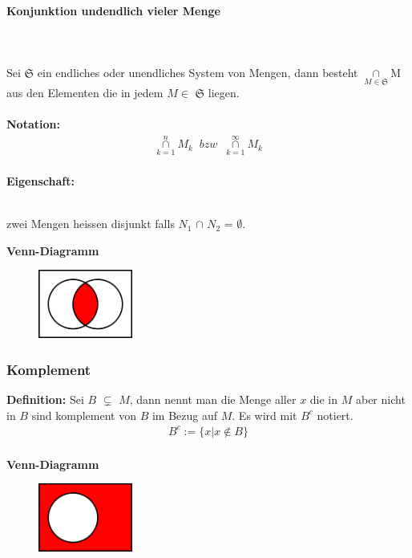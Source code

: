 \documentclass[../AbiMappe_Mathe.tex]{subfiles}
\begin{document}
\paragraph{Konjunktion undendlich vieler Menge}
		\hspace{0 cm} \\ \noindent \\
		Sei $\mathfrak{S}$ ein endliches oder unendliches System von Mengen, dann besteht $\underset{M \in \mathfrak{S}}{\cap}$M aus den Elementen die in jedem $M \in  $ $\mathfrak{S}$ liegen.\\\\
\textbf{Notation:}\\
\begin{align*}
\underset{k=1}{\overset{n}{\cap}}M_k \;\;bzw\;\; \underset{k=1}{\overset{\infty}{\cap}}M_k
\end{align*}\\
\textbf{Eigenschaft:}\\
\\
\begin{description}
\vspace{-1cm}
\item[$\bullet$]zwei Mengen heissen disjunkt falls $N_1$ $\cap$ $N_2$ = $\emptyset$.
\end{description}
\textbf{Venn-Diagramm}
\begin{figure}[H]
\centering
\includegraphics[width=117px, height=85.5px]{VennKon.png}
\end{figure}

\subsubsection{Komplement}
\textbf{Definition:} Sei $B$ $\subsetneq$ $M$, dann nennt man die Menge aller $x$ die in $M$ aber nicht in $B$ sind komplement von $B$ im Bezug auf $M$. Es wird mit $B^c$ notiert.
\begin{align*}
B^c:=\{x|x \notin B\}
\end{align*}
\\
\textbf{Venn-Diagramm}
\begin{figure}[H]
\centering
\includegraphics[width=117px, height=85.5px]{VennKom.png}
\end{figure}
\end{document}
